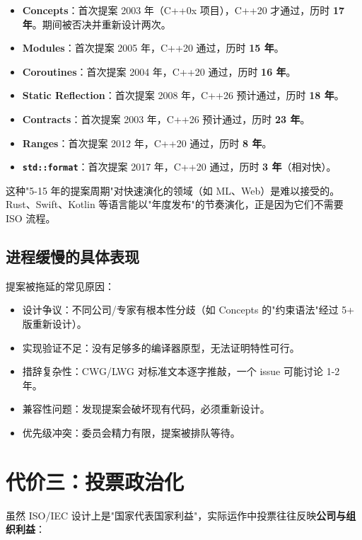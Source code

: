 \documentclass[12pt,a4paper,fontset=fandol]{ctexbook}
\newcommand{\kw}[1]{\texttt{#1}}
\begin{document}
\begin{itemize}
  \item \textbf{Concepts}：首次提案 2003 年（C++0x 项目），C++20 才通过，历时 \textbf{17 年}。期间被否决并重新设计两次。
  \item \textbf{Modules}：首次提案 2005 年，C++20 通过，历时 \textbf{15 年}。
  \item \textbf{Coroutines}：首次提案 2004 年，C++20 通过，历时 \textbf{16 年}。
  \item \textbf{Static Reflection}：首次提案 2008 年，C++26 预计通过，历时 \textbf{18 年}。
  \item \textbf{Contracts}：首次提案 2003 年，C++26 预计通过，历时 \textbf{23 年}。
  \item \textbf{Ranges}：首次提案 2012 年，C++20 通过，历时 \textbf{8 年}。
  \item \textbf{\kw{std::format}}：首次提案 2017 年，C++20 通过，历时 \textbf{3 年}（相对快）。
\end{itemize}

这种"5-15 年的提案周期"对快速演化的领域（如 ML、Web）是难以接受的。Rust、Swift、Kotlin 等语言能以"年度发布"的节奏演化，正是因为它们不需要 ISO 流程。

\subsection{进程缓慢的具体表现}

提案被拖延的常见原因：

\begin{itemize}
  \item 设计争议：不同公司/专家有根本性分歧（如 Concepts 的"约束语法"经过 5+ 版重新设计）。
  \item 实现验证不足：没有足够多的编译器原型，无法证明特性可行。
  \item 措辞复杂性：CWG/LWG 对标准文本逐字推敲，一个 issue 可能讨论 1-2 年。
  \item 兼容性问题：发现提案会破坏现有代码，必须重新设计。
  \item 优先级冲突：委员会精力有限，提案被排队等待。
\end{itemize}

\section{代价三：投票政治化}

虽然 ISO/IEC 设计上是"国家代表国家利益"，实际运作中投票往往反映\textbf{公司与组织利益}：
\end{document}
